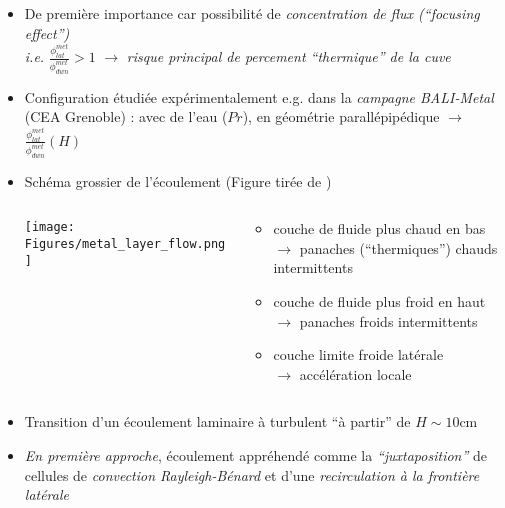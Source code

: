 \begin{frame}[fragile]
\begin{itemize}
\item De première importance car possibilité de \emph{concentration de flux (``focusing effect'')} \\ \textit{i.e.} $\frac{\phi^{met}_{lat}}{\phi^{met}_{dwn}}>1$ $\rightarrow$ \emph{risque principal de percement ``thermique'' de la cuve}
\item Configuration étudiée expérimentalement e.g. dans la \emph{campagne BALI-Metal} (CEA Grenoble) : avec de l'eau (\danger $Pr$), en géométrie parallépipédique $\rightarrow$ $\frac{\phi^{met}_{lat}}{\phi^{met}_{dwn}}\left(H\right)$
\item Schéma grossier de l'écoulement (Figure tirée de \cite{Villermaux1999})
\begin{columns}[T]
    \begin{column}{0.6\textwidth}
\centering \texttt{[image: Figures/metal\_layer\_flow.png]}
    \end{column}
    \begin{column}{0.5\textwidth}
    \hskip -1cm \begin{minipage}{\textwidth}
    \begin{itemize}
    \item couche de fluide plus chaud en bas \\ $\rightarrow$ panaches (``thermiques'') chauds intermittents
    \item couche de fluide plus froid en haut \\ $\rightarrow$ panaches froids intermittents
    \item couche limite froide latérale \\ $\rightarrow$ accélération locale
    \end{itemize}
    \end{minipage}
    \end{column}
\end{columns}
\item Transition d'un écoulement laminaire à turbulent ``à partir'' de $H \sim10$cm
\item \emph{En première approche}, écoulement appréhendé comme la \emph{``juxtaposition''} de cellules de \emph{convection Rayleigh-Bénard} et d'une \emph{recirculation à la frontière latérale}
\end{itemize}
\end{frame}
